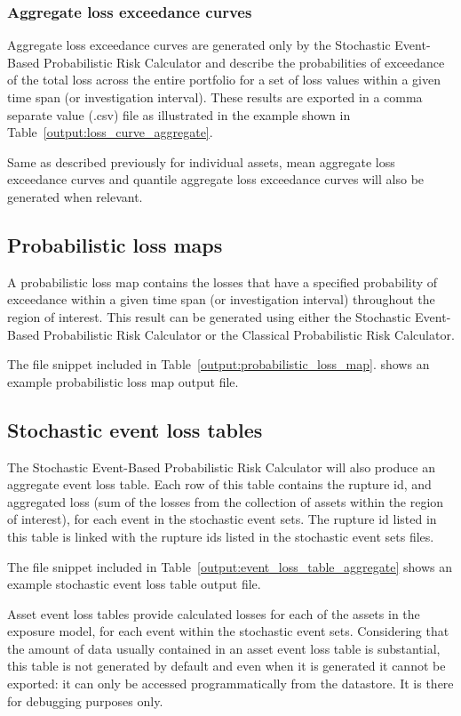 \subsubsection{Aggregate loss exceedance curves}
\label{subsubsec:aggregate_loss_curves}

Aggregate loss exceedance curves are generated only by the Stochastic Event-
Based Probabilistic Risk Calculator and describe the probabilities of
exceedance of the total loss across the entire portfolio for a set of loss
values within a given time span (or investigation interval). These results are
exported in a comma separate value (.csv) file as illustrated in the example
shown in Table~\ref{output:loss_curve_aggregate}.



Same as described previously for individual assets, mean aggregate
loss exceedance curves and quantile aggregate loss exceedance curves
will also be generated when relevant.


\subsection{Probabilistic loss maps}
\label{subsec:probabilistic_loss_map}

A probabilistic loss map contains the losses that have a specified probability
of exceedance within a given time span (or investigation interval) throughout
the region of interest. This result can be generated using either the
Stochastic Event-Based Probabilistic Risk Calculator or the Classical
Probabilistic Risk Calculator.

The file snippet included in Table~\ref{output:probabilistic_loss_map}.
shows an example probabilistic loss map output file.




\subsection{Stochastic event loss tables}

The Stochastic Event-Based Probabilistic Risk Calculator will also produce an
aggregate event loss table. Each row of this table contains the rupture id,
and aggregated loss (sum of the losses from the collection of assets within
the region of interest), for each event in the stochastic event sets. The
rupture id listed in this table is linked with the rupture ids listed in the
stochastic event sets files.

The file snippet included in Table~\ref{output:event_loss_table_aggregate}
shows an example stochastic event loss table output file.



Asset event loss tables provide calculated losses for each of the
assets in the exposure model, for each event within the stochastic
event sets. Considering that the amount of data usually contained in
an asset event loss table is substantial, this table is not generated
by default and even when it is generated it cannot be exported: it can
only be accessed programmatically from the datastore. It is there for
debugging purposes only.
